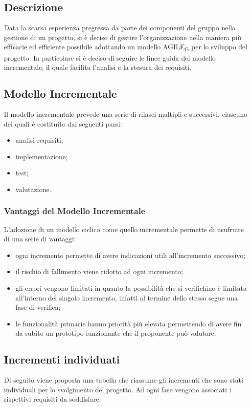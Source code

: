 \subsection{Descrizione}
Data la scarsa esperienza pregressa da parte dei componenti del gruppo nella gestione di un progetto, si è deciso di gestire l'organizzazione nella maniera più efficacie ed efficiente possibile adottando un modello AGILE\textsubscript{G} per lo sviluppo del progetto. In particolare si è deciso di seguire le linee guida del modello incrementale, il quale facilita l'analisi e la stesura dei requisiti. 
\subsection{Modello Incrementale}
Il modello incrementale prevede una serie di rilasci multipli e successivi, ciascuno dei quali è costituito dai seguenti passi: 
\begin{itemize}
    \item analisi requisiti;
    \item implementazione;
    \item test;
    \item valutazione.
\end{itemize}
\subsubsection{Vantaggi del Modello Incrementale}
L'adozione di un modello ciclico come quello incrementale permette di usufruire di una serie di vantaggi: 
\begin{itemize}
    \item ogni incremento permette di avere indicazioni utili all'incremento successivo;
    \item il rischio di fallimento viene ridotto ad ogni incremento;
    \item gli errori vengono limitati in quanto la possibilità che si verifichino è limitata all'interno del singolo incremento, infatti al termine dello stesso segue una fase di verifica;
    \item le funzionalità primarie hanno priorità più elevata permettendo di avere fin da subito un prototipo funzionante che il proponente può valutare.
\end{itemize}
\subsection{Incrementi individuati}
Di seguito viene proposta una tabella che riassume gli incrementi che sono stati individuali per lo svolgimento del progetto. Ad ogni fase vengono associati i rispettivi requisiti da soddisfare. 

